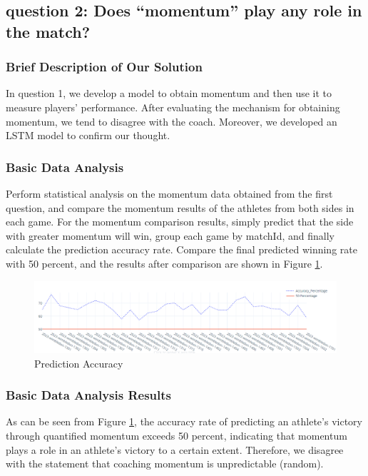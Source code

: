 \subsection{question 2: Does “momentum” play any role in the match?}
\subsubsection{Brief Description of Our Solution}
In question 1, we develop a model to obtain momentum and then use it to measure players' performance. 
After evaluating the mechanism for obtaining momentum, we tend to disagree with the coach. Moreover, we developed an LSTM model to confirm our thought.

\subsubsection{Basic Data Analysis}
Perform statistical analysis on the momentum data obtained from the first question, and compare the momentum results of the athletes from both sides in each game. For the momentum comparison results, simply predict that the side with greater momentum will win, group each game by matchId, and finally calculate the prediction accuracy rate. Compare the final predicted winning rate with 50 percent, and the results after comparison are shown in Figure \ref{fig:PA}.
\begin{figure}
    \centering
    \includegraphics[width=1\linewidth]{figure/预测准确率.png}
    \caption{\centering Prediction Accuracy}
    \label{fig:PA}
\end{figure}
\subsubsection{Basic Data Analysis Results}
As can be seen from Figure \ref{fig:PA}, the accuracy rate of predicting an athlete's victory through quantified momentum exceeds 50 percent, indicating that momentum plays a role in an athlete's victory to a certain extent. Therefore, we disagree with the statement that coaching momentum is unpredictable (random).

